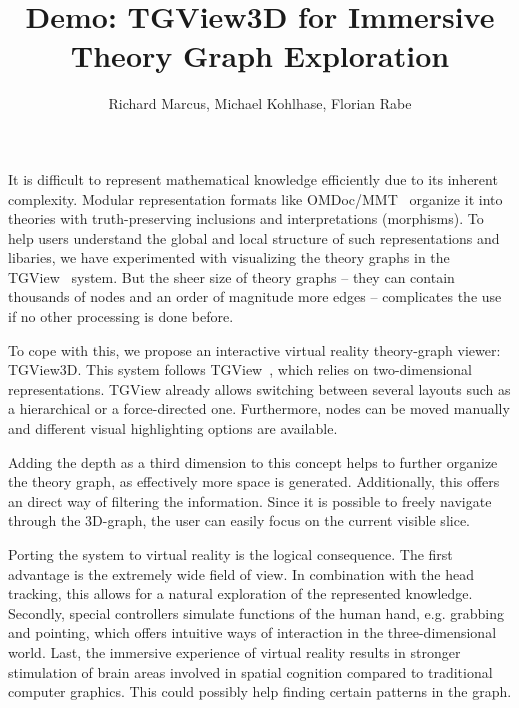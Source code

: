 \documentclass{llncs}
\title{Demo: TGView3D for Immersive Theory Graph Exploration}
\author{Richard Marcus, Michael Kohlhase, Florian Rabe}
\institute{Computer Science, FAU Erlangen-N\"urnberg}
\begin{document}
\maketitle

It is difficult to represent mathematical knowledge efficiently due to its inherent complexity.
Modular representation formats like OMDoc/MMT~\cite{Kohlhase:OMDoc1.2,RabKoh:WSMSML13} organize it into theories with truth-preserving inclusions and interpretations (morphisms).
To help users understand the global and local structure of such representations and libaries, we have experimented with visualizing the theory graphs in the TGView~\cite{RupKohMue:fitgv17} system. But the sheer size of theory graphs -- they can contain thousands of nodes and an order of magnitude more edges -- complicates the use if no other processing is done before.

To cope with this, we propose an interactive virtual reality theory-graph viewer: TGView3D. This system follows TGView~\cite{RupKohMue:fitgv17}, which relies on two-dimensional representations. TGView already allows switching between several layouts such as a hierarchical or a force-directed one. Furthermore, nodes can be moved manually and different visual highlighting options are available.

Adding the depth as a third dimension to this concept helps to further organize the theory graph, as effectively more space is generated. Additionally, this offers an direct way of filtering the information. Since it is possible to freely navigate through the 3D-graph, the user can easily focus on the current visible slice.

Porting the system to virtual reality is the logical consequence. The first advantage is the extremely wide field of view. In combination with the head tracking, this allows for a natural exploration of the represented knowledge. Secondly, special controllers simulate functions of the human hand, e.g. grabbing and pointing, which offers intuitive ways of interaction in the three-dimensional world. Last, the immersive experience of virtual reality results in stronger stimulation of brain areas involved in spatial cognition compared to traditional computer graphics. This could possibly help finding certain patterns in the graph.
\end{document}
